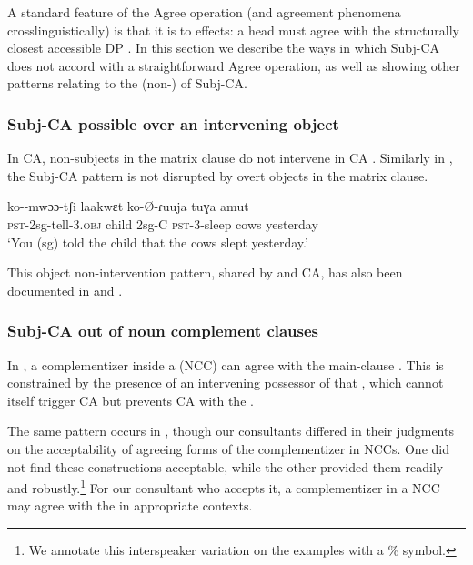 \documentclass[output=paper
,newtxmath
,modfonts
,nonflat]{langsci/langscibook}
\begin{document}
A standard feature of the Agree operation (and agreement phenomena crosslinguistically) is that it is  to  effects: a head must agree with the structurally closest accessible DP \parencite{Chomsky:2000,Chomsky:2001}. In this section we describe the ways in which  Subj-CA does not accord with a straightforward Agree operation, as well as showing other patterns relating to the (non-)  of Subj-CA. 

\subsubsection{Subj-CA possible over an intervening object}

In  CA, non-subjects in the matrix clause do not intervene in CA \citep{Diercks:2013}. Similarly in , the Subj-CA pattern is not disrupted by overt objects in the matrix clause. 

\ea
\gll ko--mwɔɔ-tʃi laakwɛt  ko-\O-ɾuuja tuɣa amut \\
\textsc{pst}-2sg-tell-3.\textsc{obj} child 2sg-C \textsc{pst}-3-sleep cows yesterday \\
\glt `You (sg) told the child that the cows slept yesterday.'
\z

\noindent This object non-intervention pattern, shared by  and  CA, has also been documented in  \citep{Torrence:2016} and  \citep{LetsholoSafir:2017}.

\subsubsection{Subj-CA out of noun complement clauses} \label{NCCSection}

\noindent In , a complementizer inside a  (NCC) can agree with the main-clause . This is constrained by the presence of an intervening possessor of that , which cannot itself trigger CA but prevents CA with the   \citep[378]{Diercks:2013}. 

The same pattern occurs in , though our consultants differed in their judgments on the acceptability of agreeing forms of the complementizer in NCCs. One did not find these constructions acceptable, while the other provided them readily and robustly.\footnote{We annotate this interspeaker variation on the examples with a \% symbol.} For our consultant who accepts it, a complementizer in a NCC may agree with the   in appropriate contexts. 
\end{document}
